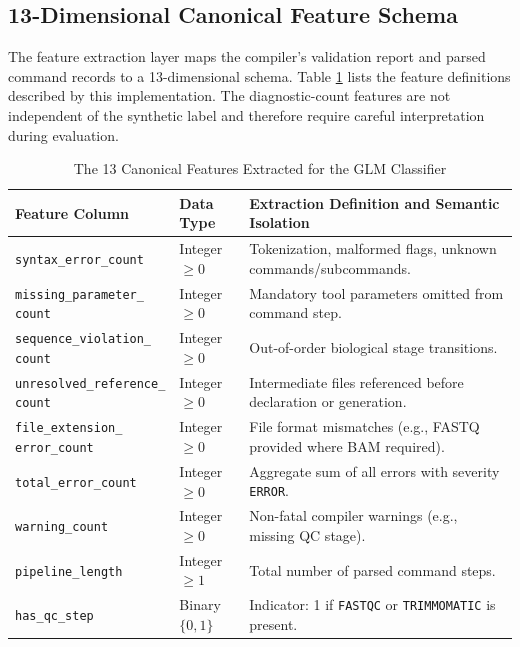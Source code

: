 \documentclass[12pt,a4paper]{article}
\begin{document}
\subsection{13-Dimensional Canonical Feature Schema}

The feature extraction layer maps the compiler's validation report and parsed command records to a 13-dimensional schema. Table \ref{tab:feature_schema} lists the feature definitions described by this implementation. The diagnostic-count features are not independent of the synthetic label and therefore require careful interpretation during evaluation.

\begin{table}[H]
\centering
\small
\caption{The 13 Canonical Features Extracted for the GLM Classifier}
\label{tab:feature_schema}
\begin{tabularx}{\textwidth}{p{5.0cm}p{1.8cm}X}
\toprule
\textbf{Feature Column} & \textbf{Data Type} & \textbf{Extraction Definition and Semantic Isolation} \\
\midrule
\texttt{syntax\_error\_count} & Integer $\ge 0$ & Tokenization, malformed flags, unknown commands/subcommands. \\
\makecell[l]{\texttt{missing\_parameter\_}\\\texttt{count}} & Integer $\ge 0$ & Mandatory tool parameters omitted from command step. \\
\makecell[l]{\texttt{sequence\_violation\_}\\\texttt{count}} & Integer $\ge 0$ & Out-of-order biological stage transitions. \\
\makecell[l]{\texttt{unresolved\_reference\_}\\\texttt{count}} & Integer $\ge 0$ & Intermediate files referenced before declaration or generation. \\
\makecell[l]{\texttt{file\_extension\_}\\\texttt{error\_count}} & Integer $\ge 0$ & File format mismatches (e.g., FASTQ provided where BAM required). \\
\texttt{total\_error\_count} & Integer $\ge 0$ & Aggregate sum of all errors with severity \texttt{ERROR}. \\
\texttt{warning\_count} & Integer $\ge 0$ & Non-fatal compiler warnings (e.g., missing QC stage). \\
\texttt{pipeline\_length} & Integer $\ge 1$ & Total number of parsed command steps. \\
\texttt{has\_qc\_step} & \makecell[c]{Binary\\$\{0,1\}$} & Indicator: 1 if \texttt{FASTQC} or \texttt{TRIMMOMATIC} is present. \\

\end{tabularx}
\end{table}
\end{document}

